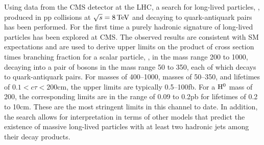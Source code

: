 Using data from the CMS detector at the LHC,
a search for long-lived particles, \X, produced in pp collisions at $\sqrt{s} = 8\,\text{Te\hspace{-.08em}V}$ and decaying
to quark-antiquark pairs has been performed. For the first time a purely hadronic signature
of long-lived particles has been explored at CMS.
The observed results are consistent with SM expectations and are used to derive upper
limits on the product of cross section times branching fraction for a scalar particle,
 \Higgs, in the mass range 200 to 1000\GeV, decaying into a pair of \X bosons in the mass
range 50 to 350\GeV, each of which decays to quark-antiquark pairs. For \Higgs masses of 400--1000\GeV, \X
masses of 50--350\GeV, and \X lifetimes of $0.1<c\tau<200$\:cm, the upper limits are typically 0.5--100\:fb.
 For a $\mathrm{H}^{0}$ mass of 200\GeV, the corresponding limits are in the range of 0.09 to 0.2\:pb for \X
lifetimes of 0.2 to 10\:cm. These are the most stringent limits in this channel to date.
In addition, the search allows for interpretation in terms of other models that predict 
the existence of massive long-lived particles with at least two hadronic
jets among their decay products.
